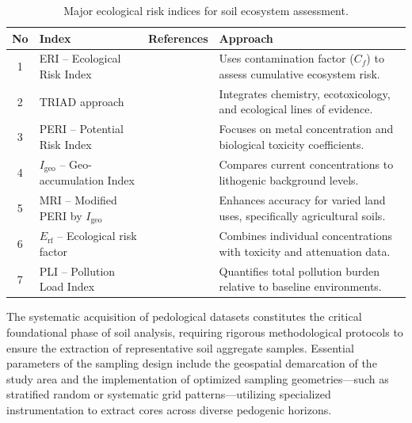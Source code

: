 \documentclass[land,article,submit,pdftex,moreauthors]{Definitions/mdpi}
\begin{document}
\begin{table}[H]
\caption{Major ecological risk indices for soil ecosystem assessment.\label{tab2_expanded}}
\begin{tabularx}{\textwidth}{@{} c p{3.5cm} X p{5.5cm} @{}}
\toprule
\textbf{No} & \textbf{Index} & \textbf{References} & \textbf{Approach} \\
\midrule
1 & ERI -- Ecological Risk Index
    & \cite{Wang2025,Egbueri2020,Adewumi2024,ElSorogy2025,Sidoruk2023,Siddig2025,Fan2025,Proshad2025,AnsoarRodriguez2025}
    & Uses contamination factor ($C_f$) to assess cumulative ecosystem
      risk. \\[4pt]
2 & TRIAD approach
    & \cite{Kim2024,Chon2011,LindhLemenkova2023b,Rasafi2021,Stojic2019,Mohammad2025,Toumi2025,Yasir2025}
    & Integrates chemistry, ecotoxicology, and ecological lines of
      evidence. \\[4pt]
3 & PERI -- Potential Risk Index
    & \cite{AnsoarRodriguez2025,Ferreira2022,Li2025a,Sidoruk2023,Siddig2025,Li2020,Wang2024a,Wang2025}
    & Focuses on metal concentration and biological toxicity
      coefficients. \\[4pt]
4 & $I_{\mathrm{geo}}$ -- Geo-accumulation Index
    & \cite{Li2014,ElSorogy2025,Wang2020,Sidoruk2023,Siddig2025,AliZerrouki2021,LindhLemenkova2022a,Racic2025}
    & Compares current concentrations to lithogenic background
      levels. \\[4pt]
5 & MRI -- Modified PERI by $I_{\mathrm{geo}}$
    & \cite{Liu2021,Ferreira2022,Siddig2025,Li2019,Adewumi2024,Wang2024a,Wang2025,Proshad2025}
    & Enhances accuracy for varied land uses, specifically agricultural
      soils. \\[4pt]
6 & $E_{\mathrm{rf}}$ -- Ecological risk factor
    & \cite{Li2025a,Liu2021,Shetty2025,Marthandan2020,Sun2025,Sidoruk2023}
    & Combines individual concentrations with toxicity and attenuation
      data. \\[4pt]
7 & PLI -- Pollution Load Index
    & \cite{Li2022b,Chukwuonye2025,Wan2019,Mukhopadhyay2020,Sidoruk2023,Li2020,Wang2020,ElSorogy2025}
    & Quantifies total pollution burden relative to baseline
      environments. \\
\bottomrule
\end{tabularx}
\end{table}

The systematic acquisition of pedological datasets constitutes the critical
foundational phase of soil analysis, requiring rigorous methodological
protocols to ensure the extraction of representative soil aggregate samples.
Essential parameters of the sampling design include the geospatial demarcation
of the study area and the implementation of optimized sampling
geometries---such as stratified random or systematic grid patterns---utilizing
specialized instrumentation to extract cores across diverse pedogenic horizons.
\end{document}

